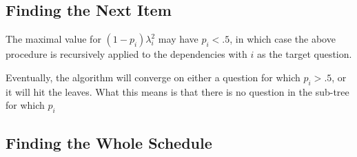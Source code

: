 \subsection{Finding the Next Item}

The maximal value for $(1 - p_i) \lambda_i^2$ may have $p_i < .5$, in which
case the above procedure is recursively applied to the dependencies with
$i$ as the target question.  

Eventually, the algorithm will converge on either a question for which $p_i >
.5$, or it will hit the leaves.  What this means is that there is no question
in the sub-tree for which $p_i$

\subsection{Finding the Whole Schedule}


